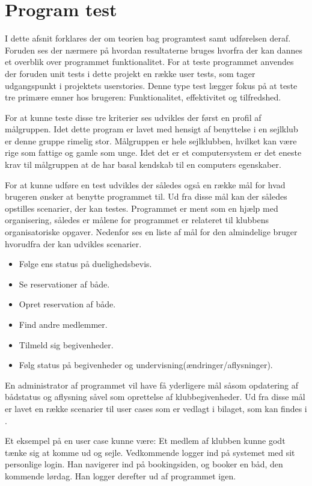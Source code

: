 \chapter{Program test}
I dette afsnit forklares der om teorien bag programtest samt udførelsen deraf. Foruden ses der nærmere på hvordan resultaterne bruges hvorfra der kan dannes et overblik over programmet funktionalitet. For at teste programmet anvendes der foruden unit tests i dette projekt en række user tests, som tager udgangspunkt i projektets userstories. Denne type test lægger fokus på at teste tre primære emner hos brugeren: Funktionalitet, effektivitet og tilfredshed. 

For at kunne teste disse tre kriterier ses udvikles der først en profil af målgruppen. Idet dette program er lavet med hensigt af benyttelse i en sejlklub er denne gruppe rimelig stor. Målgruppen er hele sejlklubben, hvilket kan være rige som fattige og gamle som unge. Idet det er et computersystem er det eneste krav til målgruppen at de har basal kendskab til en computers egenskaber.

For at kunne udføre en test udvikles der således også en række mål for hvad brugeren ønsker at benytte programmet til. Ud fra disse mål kan der således opstilles scenarier, der kan testes. Programmet er ment som en hjælp med organisering, således er målene for programmet er relateret til klubbens organisatoriske opgaver. Nedenfor ses en liste af mål for den almindelige bruger hvorudfra der kan udvikles scenarier.

\begin{itemize}
  \item Følge ens status på duelighedsbevis.
  \item Se reservationer af både.
  \item Opret reservation af både.
  \item Find andre medlemmer.
  \item Tilmeld sig begivenheder.
  \item Følg status på begivenheder og undervisning(ændringer/aflysninger).
\end{itemize}

En administrator af programmet vil have få yderligere mål såsom opdatering af bådstatus og aflysning såvel som oprettelse af klubbegivenheder. Ud fra disse mål er lavet en række scenarier til user cases som er vedlagt i bilaget, som kan findes i . 

Et eksempel på en user case kunne være: Et medlem af klubben kunne godt tænke sig at komme ud og sejle. Vedkommende logger ind på systemet med sit personlige login. Han navigerer ind på bookingsiden, og booker en båd, den kommende lørdag. Han logger derefter ud af programmet igen.

